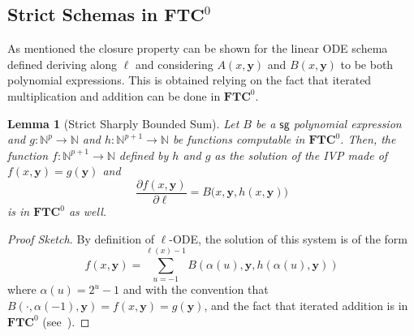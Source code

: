\documentclass[11pt, oneside]{article}
\newcommand{\fun}[1]{\mathsf{#1}}
\newcommand{\sB}{B}
\newcommand{\sA}{A}
\newcommand{\Nat}{\mathbb{N}}
\newcommand{\TC}{\mathbf{FTC}}
\newcommand{\tu}[1]{\mathbf{#1}}
\newtheorem{lemma}{Lemma}
\theoremstyle{definition}
\newtheorem{example}{Example}
\newcommand{\pODE}{\ell\text{-pODE}}
\begin{document}
\begin{toappendix} 
\subsection{Strict Schemas in $\TC^0$}\label{appendix:strictTC}
As mentioned the closure property can be shown for the linear ODE schema defined deriving along $\ell$ and considering $\sA(x, \tu y)$ and $\sB (x, \tu y)$ to be both polynomial expressions.
%
This is obtained relying on the fact that iterated multiplication and addition can be done in $\TC^0$.

\begin{lemma}[Strict Sharply Bounded Sum]\label{lemma:BSum}
    Let $\sB$ be a $\fun{sg}$ polynomial expression and $g:\Nat^p \to \Nat$ and $h: \Nat^{p+1}\to \Nat$ be functions computable in $\TC^0$.
    Then, the function $f:\Nat^{p+1}\to \Nat$ defined by $h$ and $g$ as the solution of the IVP made of $f(x, \tu y) = g(\tu y)$ and
    $$
        \frac{\partial f(x,\tu y)}{\partial \ell} = \sB(x, \tu y, h(x, \tu y)\big)
    $$
    is in $\TC^0$ as well.
\end{lemma}
\begin{proof}[Proof Sketch]
    By definition of $\ell$-ODE, the solution of this system is of the form 
    $$
    f(x, \tu y) = \sum^{\ell(x)-1}_{u=-1} \sB(\alpha(u), \tu y, h(\alpha(u), \tu y))
    $$
    where $\alpha(u)=2^u-1$ and with the convention that $\sB(\cdot, \alpha(-1), \tu y)=f(x, \tu y)=g(\tu y)$, and the fact that iterated addition is in $\TC^0$ (see~\cite{Vollmer}). 
\end{proof}









\end{toappendix}
\end{document}
